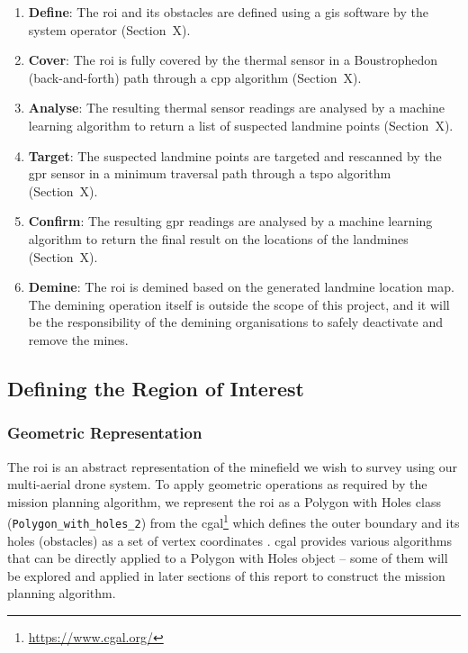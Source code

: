 \begin{enumerate}
    \item \textbf{Define}: The \gls{roi} and its obstacles are defined using a \gls{gis} software by the system operator (Section~X).
    \item \textbf{Cover}: The \gls{roi} is fully covered by the thermal sensor in a Boustrophedon (back-and-forth) path through a \gls{cpp} algorithm (Section~X).
    \item \textbf{Analyse}: The resulting thermal sensor readings are analysed by a machine learning algorithm to return a list of suspected landmine points (Section~X). 
    \item \textbf{Target}: The suspected landmine points are targeted and rescanned by the \gls{gpr} sensor in a minimum traversal path through a \gls{tspo} algorithm (Section~X). 
    \item \textbf{Confirm}: The resulting \gls{gpr} readings are analysed by a machine learning algorithm to return the final result on the locations of the landmines (Section~X). 
    \item \textbf{Demine}: The \gls{roi} is demined based on the generated landmine location map. The demining operation itself is outside the scope of this project, and it will be the responsibility of the demining organisations to safely deactivate and remove the mines.
\end{enumerate}

\subsection{Defining the Region of Interest}
\label{sec:msp_define}

\subsubsection{Geometric Representation}

The \gls{roi} is an abstract representation of the minefield we wish to survey using our multi-aerial drone system. To apply geometric operations as required by the mission planning algorithm, we represent the \gls{roi} as a Polygon with Holes class (\texttt{Polygon\_with\_holes\_2}) from the \gls{cgal}\footnote{\url{https://www.cgal.org/}} which defines the outer boundary and its holes (obstacles) as a set of vertex coordinates \cite{cgal2024pwh}. \gls{cgal} provides various algorithms that can be directly applied to a Polygon with Holes object -- some of them will be explored and applied in later sections of this report to construct the mission planning algorithm. 

